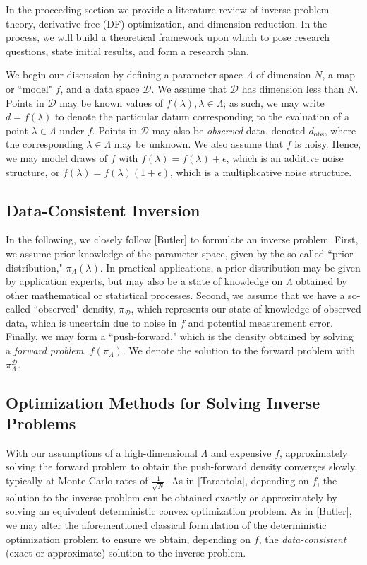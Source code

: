 \documentclass{amsart}
\begin{document}
In the proceeding section we provide a literature review of inverse problem theory, derivative-free (DF) optimization, and dimension reduction. In the process, we will build a theoretical framework upon which to pose research questions, state initial results, and form a research plan. 

We begin our discussion by defining a parameter space $\Lambda$ of dimension $N$, a map or ``model" $f$, and a data space $\mathcal{D}$. We assume that $\mathcal{D}$ has dimension less than $N$. Points in $\mathcal{D}$ may be known values of $f(\lambda), \lambda\in \Lambda$; as such, we may write $d=f(\lambda)$ to denote the particular datum corresponding to the evaluation of a point $\lambda \in \Lambda$ under $f$. Points in $\mathcal{D}$ may also be \textit{observed} data, denoted $d_{\text{obs}}$, where the corresponding $\lambda\in \Lambda$ may be unknown. We also assume that $f$ is noisy. Hence, we may model draws of $f$ with $f(\lambda)=f(\lambda)+\epsilon$, which is an additive noise structure, or $f(\lambda)=f(\lambda)(1+\epsilon)$, which is a multiplicative noise structure.


\subsection{Data-Consistent Inversion}


In the following, we closely follow [Butler] to formulate an inverse problem. First, we assume prior knowledge of the parameter space, given by the so-called ``prior distribution," $\pi_\Lambda(\lambda)$. In practical applications, a prior distribution may be given by application experts, but may also be a state of knowledge on $\Lambda$ obtained by other mathematical or statistical processes. Second, we assume that we have a so-called ``observed" density, $\pi_\mathcal{D}$, which represents our state of knowledge of observed data, which is uncertain due to noise in $f$ and potential measurement error. Finally, we may form a ``push-forward," which is the density obtained by solving a \textit{forward problem}, $f\left(\pi_\Lambda \right)$. We denote the solution to the forward problem with $\pi_\Lambda^\mathcal{D}$.

\subsection{Optimization Methods for Solving Inverse Problems}

With our assumptions of a high-dimensional $\Lambda$ and expensive $f$, approximately solving the forward problem to obtain the push-forward density converges slowly, typically at Monte Carlo rates of $ \frac{1}{\sqrt{N}}$. As in [Tarantola], depending on $f$, the solution to the inverse problem can be obtained exactly or approximately by solving an equivalent deterministic convex optimization problem. As in [Butler], we may alter the aforementioned classical formulation of the deterministic optimization problem to ensure we obtain, depending on $f$, the \textit{data-consistent} (exact or approximate) solution to the inverse problem.
\end{document}
